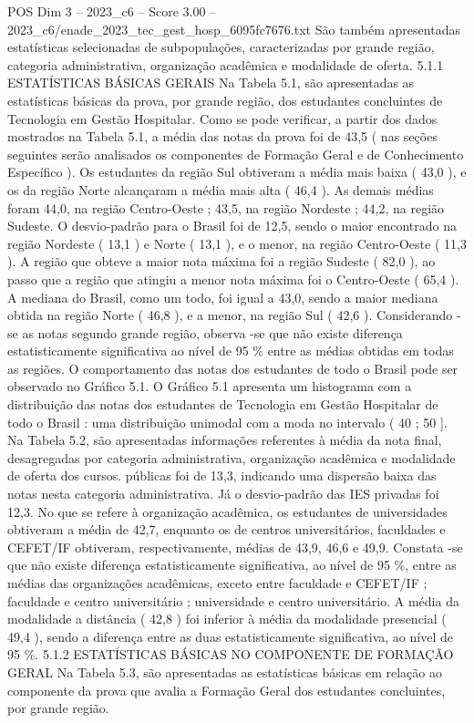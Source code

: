 \begin{textsample}{POS Dim 3 – 2023\_c6 – Score 3.00 – 2023\_c6/enade\_2023\_tec\_gest\_hosp\_6095fc7676.txt}
São também apresentadas estatísticas selecionadas de subpopulações, caracterizadas por grande região, categoria administrativa, organização acadêmica e modalidade de oferta. 5.1.1 ESTATÍSTICAS BÁSICAS GERAIS Na Tabela 5.1, são apresentadas as estatísticas básicas da prova, por grande região, dos estudantes concluintes de Tecnologia em Gestão Hospitalar.
Como se pode verificar, a partir dos dados mostrados na Tabela 5.1, a média das notas da prova foi de 43,5 ( nas seções seguintes serão analisados os componentes de Formação Geral e de Conhecimento Específico ).
Os estudantes da região Sul obtiveram a média mais baixa ( 43,0 ), e os da região Norte alcançaram a média mais alta ( 46,4 ).
As demais médias foram 44,0, na região Centro-Oeste ; 43,5, na região Nordeste ; 44,2, na região Sudeste.
O desvio-padrão para o Brasil foi de 12,5, sendo o maior encontrado na região Nordeste ( 13,1 ) e Norte ( 13,1 ), e o menor, na região Centro-Oeste ( 11,3 ).
A região que obteve a maior nota máxima foi a região Sudeste ( 82,0 ), ao passo que a região que atingiu a menor nota máxima foi o Centro-Oeste ( 65,4 ).
A mediana do Brasil, como um todo, foi igual a 43,0, sendo a maior mediana obtida na região Norte ( 46,8 ), e a menor, na região Sul ( 42,6 ).
Considerando -se as notas segundo grande região, observa -se que não existe diferença estatisticamente significativa ao nível de 95 \% entre as médias obtidas em todas as regiões.
O comportamento das notas dos estudantes de todo o Brasil pode ser observado no Gráfico 5.1.
O Gráfico 5.1 apresenta um histograma com a distribuição das notas dos estudantes de Tecnologia em Gestão Hospitalar de todo o Brasil : uma distribuição unimodal com a moda no intervalo ( 40 ; 50 ].
Na Tabela 5.2, são apresentadas informações referentes à média da nota final, desagregadas por categoria administrativa, organização acadêmica e modalidade de oferta dos cursos. públicas foi de 13,3, indicando uma dispersão baixa das notas nesta categoria administrativa.
Já o desvio-padrão das IES privadas foi 12,3.
No que se refere à organização acadêmica, os estudantes de universidades obtiveram a média de 42,7, enquanto os de centros universitários, faculdades e CEFET/IF obtiveram, respectivamente, médias de 43,9, 46,6 e 49,9.
Constata -se que não existe diferença estatisticamente significativa, ao nível de 95 \%, entre as médias das organizações acadêmicas, exceto entre faculdade e CEFET/IF ; faculdade e centro universitário ; universidade e centro universitário.
A média da modalidade a distância ( 42,8 ) foi inferior à média da modalidade presencial ( 49,4 ), sendo a diferença entre as duas estatisticamente significativa, ao nível de 95 \%. 5.1.2 ESTATÍSTICAS BÁSICAS NO COMPONENTE DE FORMAÇÃO GERAL Na Tabela 5.3, são apresentadas as estatísticas básicas em relação ao componente da prova que avalia a Formação Geral dos estudantes concluintes, por grande região.

\end{textsample}
